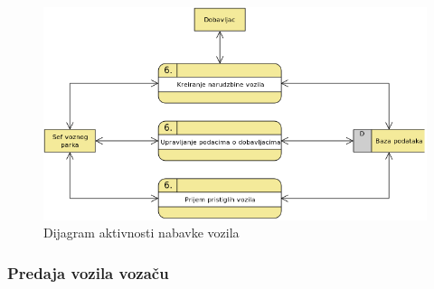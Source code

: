 \begin{figure}[H]
\begin{left}
\includegraphics[width=\textwidth]{Slike/NabavkaVozila.png}
\end{left}
    \caption{Dijagram aktivnosti nabavke vozila}
\label{fig:NabavkaVozila}
\end{figure}

\subsubsection{\bfseries Predaja vozila vozaču}

